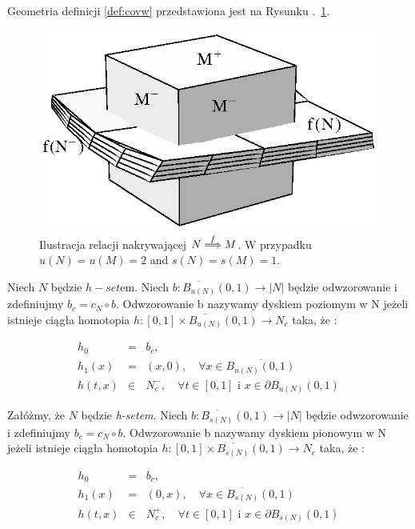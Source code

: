 Geometria definicji  \ref{def:covw} przedstawiona jest na 
Rysunku .~\ref{fig:cover}.

\begin{figure}[htbp]
\centerline{
    \includegraphics[width=.5\textwidth]{cover.eps}
    }
\caption{Ilustracja relacji nakrywającej $N\stackrel{f}{\Longrightarrow}M$. W przypadku $u(N)=u(M)=2$ and $s(N)=s(M)=1$.\label{fig:cover}}
\end{figure}

\begin{definition}\label{def:horizontalDisk}
Niech $N$ będzie $h-set$em. Niech $ b:\overline{B_{u(N)}}(0,1) \to |N| $
będzie odwzorowanie i zdefiniujmy $b_c = c_N \circ b$. Odwzorowanie b nazywamy dyskiem poziomym w N jeżeli istnieje ciągła homotopia $ h: [0,1] \times \overline{B_{u(N)}}(0,1) \to
N_c $ taka, że :
	
\begin{eqnarray*}
    h_0&=&b_c, \\
    h_1(x)&=&(x,0),\quad \forall x \in \overline{B_{u(N)}(0,1)}\\
    h(t,x)&\in &N^-_c,\quad \forall t \in [0,1] \mbox{ i } x \in \partial B_{u(N)}(0,1)
\end{eqnarray*}
\end{definition}

\begin{definition}\label{def:verticalDisk}
Załóżmy, że $N$ będzie {\em h-setem}. Niech $ b:\overline{B_{s(N)}}(0,1) \to |N| $
będzie odwzorowanie i zdefiniujmy $b_c = c_N \circ b$. Odwzorowanie b nazywamy dyskiem pionowym w N jeżeli istnieje ciągła homotopia $ h: [0,1] \times \overline{B_{s(N)}}(0,1) \to
N_c $ taka, że :
	
\begin{eqnarray*}
    h_0&=&b_c, \\
    h_1(x)&=&(0,x),\quad \forall x \in \overline{B_{s(N)}}(0,1)\\
    h(t,x)&\in &N^+_c,\quad \forall t \in [0,1] \mbox{ i } x \in \partial B_{s(N)}(0,1)
\end{eqnarray*}
\end{definition}

